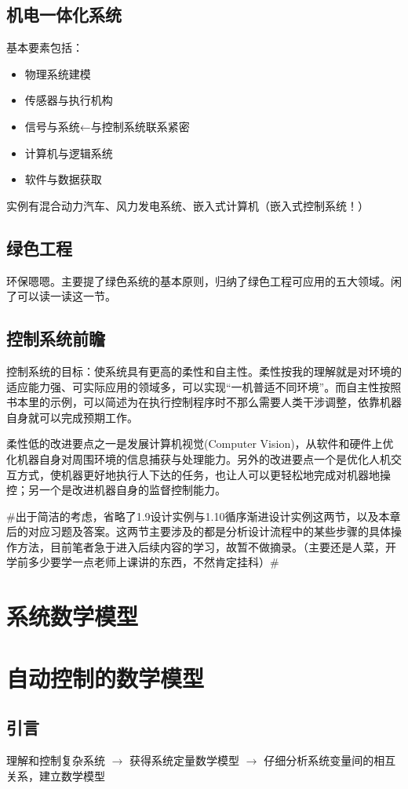 \documentclass[oneside,a4paper]{ctexbook}
\begin{document}
\section{机电一体化系统}
基本要素包括：
\begin{itemize}
    \item 物理系统建模
    \item 传感器与执行机构
    \item 信号与系统←\dag 与控制系统联系紧密
    \item 计算机与逻辑系统
    \item 软件与数据获取   
\end{itemize}
实例有混合动力汽车、风力发电系统、嵌入式计算机（嵌入式控制系统！）
\section{绿色工程}
环保嗯嗯。主要提了绿色系统的基本原则，归纳了绿色工程可应用的五大领域。闲了可以读一读这一节。

\section{控制系统前瞻}
控制系统的目标：使系统具有更高的柔性和自主性。柔性按我的理解就是对环境的适应能力强、可实际应用的领域多，可以实现“一机普适不同环境”。而自主性按照书本里的示例，可以简述为在执行控制程序时不那么需要人类干涉调整，依靠机器自身就可以完成预期工作。

柔性低的改进要点之一是发展计算机视觉(Computer Vision)，从软件和硬件上优化机器自身对周围环境的信息捕获与处理能力。另外的改进要点一个是优化人机交互方式，使机器更好地执行人下达的任务，也让人可以更轻松地完成对机器地操控；另一个是改进机器自身的监督控制能力。


\textcolor{black!35!}{\#出于简洁的考虑，省略了1.9设计实例与1.10循序渐进设计实例这两节，以及本章后的对应习题及答案。这两节主要涉及的都是分析设计流程中的某些步骤的具体操作方法，目前笔者急于进入后续内容的学习，故暂不做摘录。（主要还是人菜，开学前多少要学一点老师上课讲的东西，不然肯定挂科）\#}


\chapter{系统数学模型}
\chapter{自动控制的数学模型}
\section{引言}
理解和控制复杂系统 $\rightarrow$ 获得系统定量数学模型 $\rightarrow$ 仔细分析系统变量间的相互关系，建立数学模型 %
\end{document}
